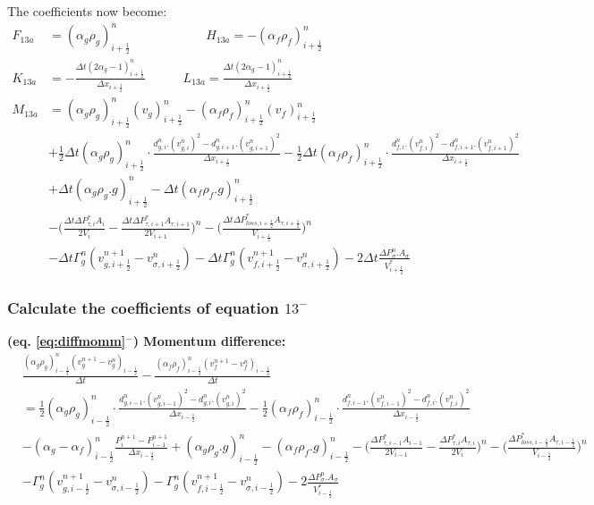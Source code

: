 \documentclass[11pt,letterpaper,titlepage]{article}
\newcommand{\half}{\frac{1}{2}}
\begin{document}
\newline
The coefficients now become:
\begin{equation*}
\begin{aligned}
  F_{13a} &=  (\alpha_g\rho_g )_{i+\half}^n \quad \quad \quad \quad \quad \quad 
  H_{13a}  = -(\alpha_f\rho_f )_{i+\half}^n \\
  K_{13a} &= -\frac{\Delta t(2\alpha_g-1)_{i+\half}^n}{\Delta x_{i+\half}} \quad \quad \quad 
  L_{13a}  =  \frac{\Delta t(2\alpha_g-1)_{i+\half}^n}{\Delta x_{i+\half}} \\
  M_{13a} &= (\alpha_g\rho_g )_{i+\half}^n(v_g)^{n}_{i+\half}
   -(\alpha_f\rho_f )_{i+\half}^n(v_f)^{n}_{i+\half}\\
  &+\half \Delta t (\alpha_g \rho_{g})_{i+\half}^n \cdot\frac{d_{g,i}^n.(v_{g,i}^n)^2-d_{g,i+1}^n.(v_{g,i+1}^n)^2}{\Delta x_{i+\half}} 
  -\half \Delta t (\alpha_f \rho_{f})_{i+\half}^n \cdot\frac{d_{f,i}^n.(v_{f,i}^n)^2-d_{f,i+1}^n.(v_{f,i+1}^n)^2}{\Delta x_{i+\half}} \\
  &+ \Delta t(\alpha_g \rho_{g}.g)_{i+\half}^n 
  - \Delta t(\alpha_f \rho_{f}.g)_{i+\half}^n \\
  &-\biggr(\frac{\Delta t\Delta P_{\tau,i}^*A_i}{2V_i}-\frac{\Delta t\Delta P_{\tau,i+1}^*A_{\tau,i+1}}{2V_{i+1}}\biggr)^n 
  -\biggr(\frac{\Delta t\Delta P_{loss,i+\half}^*A_{\tau,i+\half}}{V_{i+\half}}\biggr)^n\\
  & - \Delta t\Gamma_g^n (v_{g,i+\half}^{n+1} - v_{\sigma,i+\half}^n)
    - \Delta t\Gamma_g^n (v_{f,i+\half}^{n+1} - v_{\sigma,i+\half}^n)
    -2\Delta t\frac{\Delta P_{\sigma}^n.A_{\sigma}}{V_{i+\half}^*}
\end{aligned}
\end{equation*}


\newpage
\subsubsection{Calculate the coefficients of equation $13^-$}
\textbf{(eq. \ref{eq:diffmomm}$^-$) Momentum difference:}
\begin{equation*}
\begin{aligned}
&\frac{(\alpha_g\rho_g )_{i-\half}^n (v_g^{n+1} -v_g^{n})_{i-\half}}{\Delta t}
-\frac{(\alpha_f\rho_f )_{i-\half}^n (v_f^{n+1} -v_f^{n})_{i-\half}}{\Delta t}\\
&=\half (\alpha_g \rho_{g})_{i-\half}^n \cdot\frac{d_{g,i-1}^n.(v_{g,i-1}^n)^2-d_{g,i}^n.(v_{g,i}^n)^2}{\Delta x_{i-\half}} 
-\half (\alpha_f \rho_{f})_{i-\half}^n \cdot\frac{d_{f,i-1}^n.(v_{f,i-1}^n)^2-d_{f,i}^n.(v_{f,i}^n)^2}{\Delta x_{i-\half}} \\
&-(\alpha_g-\alpha_f)_{i-\half}^n\frac{P_{i}^{n+1}-P_{i-1}^{n+1} }{\Delta x_{i-\half}} + (\alpha_g \rho_{g}.g)_{i-\half}^n - (\alpha_f \rho_{f}.g)_{i-\half}^n 
-\biggr(\frac{\Delta P_{\tau,i-1}^*A_{i-1}}{2V_{i-1}}-\frac{\Delta P_{\tau,i}^*A_{\tau,i}}{2V_{i}}\biggr)^n 
-\biggr(\frac{\Delta P_{loss,i-\half}^*A_{\tau,i-\half}}{V_{i-\half}}\biggr)^n\\
& - \Gamma_g^n (v_{g,i-\half}^{n+1} - v_{\sigma,i-\half}^n)- \Gamma_g^n (v_{f,i-\half}^{n+1} - v_{\sigma,i-\half}^n)-2\frac{\Delta P_{\sigma}^n.A_{\sigma}}{V_{i-\half}^*}
\end{aligned}
\end{equation*}
\end{document}
